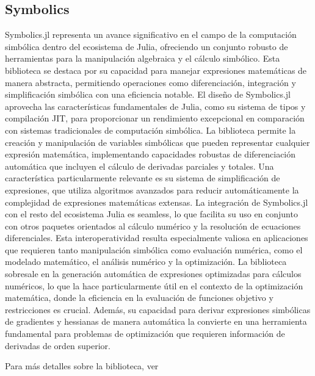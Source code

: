 \subsection*{Symbolics}
Symbolics.jl representa un avance significativo en el campo de la computación simbólica dentro del ecosistema de Julia, 
ofreciendo un conjunto robusto de herramientas para la manipulación algebraica y el cálculo simbólico. Esta biblioteca se destaca por su 
capacidad para manejar expresiones matemáticas de manera abstracta, 
permitiendo operaciones como diferenciación, integración y simplificación simbólica con una eficiencia notable. 
El diseño de Symbolics.jl aprovecha las características fundamentales de Julia, como su sistema de tipos y 
compilación JIT, para proporcionar un rendimiento excepcional en comparación con sistemas tradicionales de 
computación simbólica. La biblioteca permite la creación y manipulación de variables simbólicas que pueden 
representar cualquier expresión matemática, implementando capacidades robustas de diferenciación automática 
que incluyen el cálculo de derivadas parciales y totales. Una característica particularmente relevante es su 
sistema de simplificación de expresiones, que utiliza algoritmos avanzados para reducir automáticamente la 
complejidad de expresiones matemáticas extensas. La integración de Symbolics.jl con el resto del ecosistema 
Julia es seamless, lo que facilita su uso en conjunto con otros paquetes orientados al cálculo numérico y 
la resolución de ecuaciones diferenciales. Esta interoperatividad resulta especialmente valiosa en aplicaciones 
que requieren tanto manipulación simbólica como evaluación numérica, como el modelado matemático, el 
análisis numérico y la optimización. 
La biblioteca sobresale en la generación automática de expresiones optimizadas para cálculos numéricos, 
lo que la hace particularmente útil en el contexto de la optimización matemática, donde la eficiencia en la 
evaluación de funciones objetivo y restricciones es crucial. Además, su capacidad para derivar expresiones 
simbólicas de gradientes y hessianas de manera automática la convierte en una herramienta fundamental para 
problemas de optimización que requieren información de derivadas de orden superior.

Para más detalles sobre la biblioteca, ver \cite{SymbolicsPaper}

